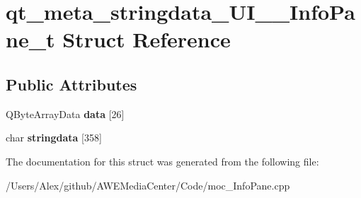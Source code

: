 \hypertarget{structqt__meta__stringdata___u_i_____info_pane__t}{\section{qt\-\_\-meta\-\_\-stringdata\-\_\-\-U\-I\-\_\-\-\_\-\-Info\-Pane\-\_\-t Struct Reference}
\label{structqt__meta__stringdata___u_i_____info_pane__t}
}
\subsection*{Public Attributes}
\begin{DoxyCompactItemize}
\item 
\hypertarget{structqt__meta__stringdata___u_i_____info_pane__t_aa363872bfe29c924b19d3e7ce92c3319}{Q\-Byte\-Array\-Data {\bfseries data} \mbox{[}26\mbox{]}}\label{structqt__meta__stringdata___u_i_____info_pane__t_aa363872bfe29c924b19d3e7ce92c3319}

\item 
\hypertarget{structqt__meta__stringdata___u_i_____info_pane__t_aa2fc24a1cc2388c1a90b72f86102784d}{char {\bfseries stringdata} \mbox{[}358\mbox{]}}\label{structqt__meta__stringdata___u_i_____info_pane__t_aa2fc24a1cc2388c1a90b72f86102784d}

\end{DoxyCompactItemize}


The documentation for this struct was generated from the following file\-:\begin{DoxyCompactItemize}
\item 
/\-Users/\-Alex/github/\-A\-W\-E\-Media\-Center/\-Code/moc\-\_\-\-Info\-Pane.\-cpp\end{DoxyCompactItemize}
